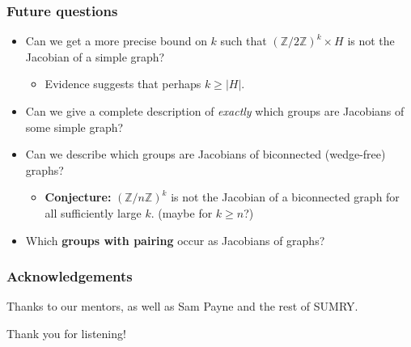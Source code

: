 \documentclass[mathserif, serif, xcolor=dvipsnames]{beamer}
\newcommand{\Z}{\ensuremath{\mathbb{Z}}}
\begin{document}
\begin{frame}
  \frametitle{Future questions}
  \begin{itemize}
    \item Can we get a more precise bound on $k$ such that $(\Z/2\Z)^k\times H$ is not the Jacobian of a simple graph?
    \medskip
      \pause
      \begin{itemize}
      \item Evidence suggests that perhaps $k\ge|H|$. 
      \end{itemize}
      \medskip
      \pause
    \item Can we give a complete description of \emph{exactly} which
      groups are Jacobians of some simple graph?
      \medskip
      \pause
    \item Can we describe which groups are Jacobians of biconnected (wedge-free)
      graphs?
      \medskip
      \pause
      \begin{itemize}
      \item \textbf{Conjecture:} $(\Z/n\Z)^k$ is not the Jacobian of a biconnected graph for all sufficiently large $k$. (maybe for $k\ge n$?)
      \end{itemize}
      \pause
      \item Which \textbf{groups with pairing} occur as Jacobians of graphs?
  \end{itemize}
\end{frame}

\begin{frame}
  \frametitle{Acknowledgements}

  Thanks to our mentors, as well as Sam Payne and the rest of
  SUMRY. 
  
  \vspace{1cm}
  
  Thank you for listening!
  
\end{frame}

\end{document}
